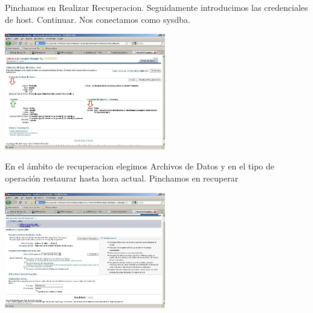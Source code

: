 \documentclass[a4paper,twocolumn,10pt]{article}
\begin{document}
Pinchamos en Realizar Recuperacion. Seguidamente introducimos las credenciales de host. Continuar. Nos conectamos como sysdba.
\begin{center}
\includegraphics[width=7cm]{./Imagenes/eje7.jpg}
\end{center}
En el \'ambito de recuperacion elegimos Archivos de Datos y en el tipo de operaci\'on restaurar hasta hora actual. Pinchamos en recuperar
\begin{center}
\includegraphics[width=7cm]{./Imagenes/eje8.jpg}
\end{center}
      
\end{document}
